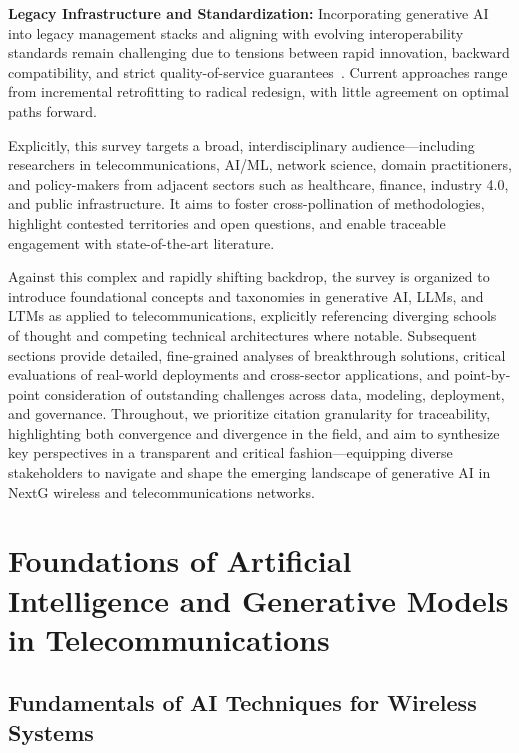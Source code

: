 \documentclass[sigconf]{acmart}
\begin{document}
\textbf{Legacy Infrastructure and Standardization:} Incorporating generative AI into legacy management stacks and aligning with evolving interoperability standards remain challenging due to tensions between rapid innovation, backward compatibility, and strict quality-of-service guarantees~\cite{ref25, ref39, ref40, ref46}. Current approaches range from incremental retrofitting to radical redesign, with little agreement on optimal paths forward.

Explicitly, this survey targets a broad, interdisciplinary audience—including researchers in telecommunications, AI/ML, network science, domain practitioners, and policy-makers from adjacent sectors such as healthcare, finance, industry 4.0, and public infrastructure. It aims to foster cross-pollination of methodologies, highlight contested territories and open questions, and enable traceable engagement with state-of-the-art literature.

Against this complex and rapidly shifting backdrop, the survey is organized to introduce foundational concepts and taxonomies in generative AI, LLMs, and LTMs as applied to telecommunications, explicitly referencing diverging schools of thought and competing technical architectures where notable. Subsequent sections provide detailed, fine-grained analyses of breakthrough solutions, critical evaluations of real-world deployments and cross-sector applications, and point-by-point consideration of outstanding challenges across data, modeling, deployment, and governance. Throughout, we prioritize citation granularity for traceability, highlighting both convergence and divergence in the field, and aim to synthesize key perspectives in a transparent and critical fashion—equipping diverse stakeholders to navigate and shape the emerging landscape of generative AI in NextG wireless and telecommunications networks.

\section{Foundations of Artificial Intelligence and Generative Models in Telecommunications}

\subsection{Fundamentals of AI Techniques for Wireless Systems}
\end{document}
